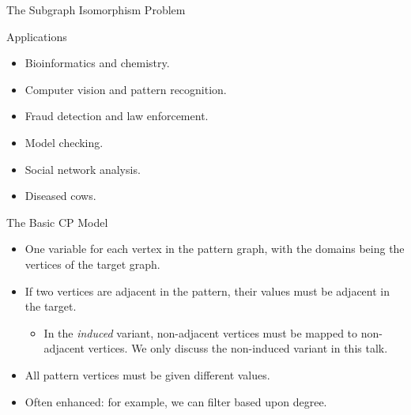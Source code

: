 \documentclass{beamer}
\begin{document}
\begin{frame}{The Subgraph Isomorphism Problem}

\end{frame}

\begin{frame}{Applications}
    \begin{itemize}
        \item Bioinformatics and chemistry.
        \item Computer vision and pattern recognition.
        \item Fraud detection and law enforcement.
        \item Model checking.
        \item Social network analysis.
        \item Diseased cows.
    \end{itemize}
\end{frame}

\begin{frame}{The Basic CP Model}
    \begin{itemize}
        \item One variable for each vertex in the pattern graph, with the domains being the vertices
            of the target graph.
        \item If two vertices are adjacent in the pattern, their values must be adjacent
            in the target.
            \begin{itemize}
                \item In the \emph{induced} variant, non-adjacent vertices must be mapped to
                    non-adjacent vertices. We only discuss the non-induced variant in this talk.
            \end{itemize}
        \item All pattern vertices must be given different values.
        \item Often enhanced: for example, we can filter based upon degree.
    \end{itemize}
\end{frame}
\end{document}
